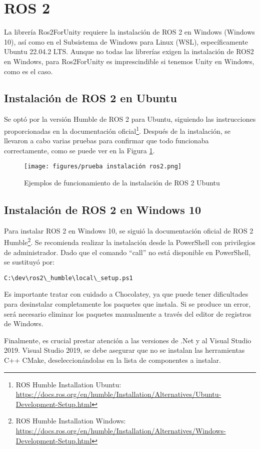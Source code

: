 \section{ROS 2}
La librería Ros2ForUnity requiere la instalación de ROS 2 en Windows (Windows 10), así como en el Subsistema de Windows para Linux (WSL), específicamente Ubuntu 22.04.2 LTS. Aunque no todas las librerías exigen la instalación de ROS2 en Windows, para Ros2ForUnity es imprescindible si tenemos Unity en Windows, como es el caso.

\subsection{Instalación de ROS 2 en Ubuntu}
Se optó por la versión Humble de ROS 2 para Ubuntu, siguiendo las instrucciones proporcionadas en la documentación oficial\footnote{ROS Humble Installation Ubuntu: \url{https://docs.ros.org/en/humble/Installation/Alternatives/Ubuntu-Development-Setup.html}}. Después de la instalación, se llevaron a cabo varias pruebas para confirmar que todo funcionaba correctamente, como se puede ver en la Figura \ref{figure:ros2-examples-installation-Ubuntu}.

\begin{figure}[ht]
   \centering
    \texttt{[image: figures/prueba instalación ros2.png]}
   \caption{Ejemplos de funcionamiento de la instalación de ROS 2 Ubuntu}
   \label{figure:ros2-examples-installation-Ubuntu}
\end{figure}

\subsection{Instalación de ROS 2 en Windows 10}
Para instalar ROS 2 en Windows 10, se siguió la documentación oficial de ROS 2 Humble\footnote{ROS Humble Installation Windows: \url{https://docs.ros.org/en/humble/Installation/Alternatives/Windows-Development-Setup.html}}. Se recomienda realizar la instalación desde la PowerShell con privilegios de administrador. Dado que el comando ``call'' no está disponible en PowerShell, se sustituyó por:

\begin{verbatim}
C:\dev\ros2\_humble\local\_setup.ps1
\end{verbatim}



Es importante tratar con cuidado a Chocolatey, ya que puede tener dificultades para desinstalar completamente los paquetes que instala. Si se produce un error, será necesario eliminar los paquetes manualmente a través del editor de registros de Windows.



Finalmente, es crucial prestar atención a las versiones de .Net y al Visual Studio 2019. Visual Studio 2019, se debe asegurar que no se instalan las herramientas C++ CMake, deseleccionándolas en la lista de componentes a instalar.

